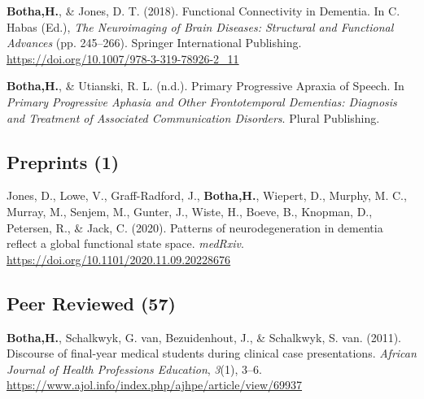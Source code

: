 \documentclass[11pt, a4paper]{awesome-cv}
\begin{document}
\begingroup
\footnotesize
\setlength{\leftskip}{0.1in}
\setlength{\parindent}{-0.1in}

\hypertarget{refs_bookchp}{}
\leavevmode\hypertarget{ref-botha_functional_2018}{}%
\textbf{Botha,H.}, \& Jones, D. T. (2018). Functional {Connectivity} in
{Dementia}. In C. Habas (Ed.), \emph{The {Neuroimaging} of {Brain}
{Diseases}: {Structural} and {Functional} {Advances}} (pp. 245--266).
Springer International Publishing.
\url{https://doi.org/10.1007/978-3-319-78926-2_11}

\leavevmode\hypertarget{ref-botha_primary_nodate}{}%
\textbf{Botha,H.}, \& Utianski, R. L. (n.d.). Primary {Progressive}
{Apraxia} of {Speech}. In \emph{Primary {Progressive} {Aphasia} and
{Other} {Frontotemporal} {Dementias}: {Diagnosis} and {Treatment} of
{Associated} {Communication} {Disorders}}. Plural Publishing.

\endgroup

\hypertarget{preprints-1}{%
\subsection{Preprints (1)}\label{preprints-1}}

\begingroup
\footnotesize
\setlength{\leftskip}{0.1in}
\setlength{\parindent}{-0.1in}

\hypertarget{refs_preprint}{}
\leavevmode\hypertarget{ref-jones_patterns_2020}{}%
Jones, D., Lowe, V., Graff-Radford, J., \textbf{Botha,H.}, Wiepert, D.,
Murphy, M. C., Murray, M., Senjem, M., Gunter, J., Wiste, H., Boeve, B.,
Knopman, D., Petersen, R., \& Jack, C. (2020). Patterns of
neurodegeneration in dementia reflect a global functional state space.
\emph{medRxiv}. \url{https://doi.org/10.1101/2020.11.09.20228676}

\endgroup

\hypertarget{peer-reviewed-57}{%
\subsection{Peer Reviewed (57)}\label{peer-reviewed-57}}

\begingroup
\footnotesize
\setlength{\leftskip}{0.1in}
\setlength{\parindent}{-0.1in}

\hypertarget{refs_journals}{}
\leavevmode\hypertarget{ref-botha_discourse_2011}{}%
\textbf{Botha,H.}, Schalkwyk, G. van, Bezuidenhout, J., \& Schalkwyk, S.
van. (2011). Discourse of final-year medical students during clinical
case presentations. \emph{African Journal of Health Professions
Education}, \emph{3}(1), 3--6.
\url{https://www.ajol.info/index.php/ajhpe/article/view/69937}
\end{document}
